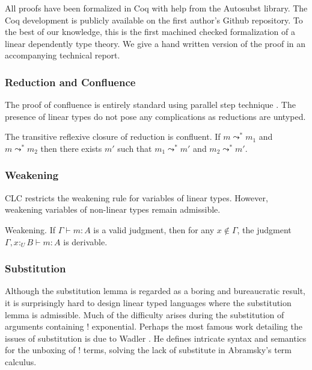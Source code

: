 \documentclass[sigplan,screen,review,anonymous]{acmart}
\newcommand{\utype}{:_{\scriptscriptstyle U}}
\newcommand{\step}{\leadsto}
\begin{document}
All proofs have been formalized in Coq with help from the Autosubst \cite{autosubst} library. The Coq development is publicly available on the first author's Github repository. To the best of our knowledge, this is the first machined checked formalization of a linear dependently type theory. We give a hand written version of the proof in an accompanying technical report.

\subsubsection{Reduction and Confluence}

The proof of confluence is entirely standard using parallel step technique \cite{takahashi}. The presence of linear types do not pose any complications as reductions are untyped.

\begin{theorem}
  The transitive reflexive closure of reduction is confluent. If $m \step^* m_1$ and $m \step^* m_2$ then there exists $m'$ such that $m_1 \step^* m'$ and $m_2 \step^* m'$.
\end{theorem}

\subsubsection{Weakening} \label{weakening}
CLC restricts the weakening rule for variables of linear types. However, weakening variables of non-linear types remain admissible.

\begin{theorem}
  Weakening. If $\Gamma \vdash m : A$ is a valid judgment, then for any $x \notin \Gamma$, the judgment $\Gamma, x \utype B \vdash m : A$ is derivable.
\end{theorem}

\subsubsection{Substitution} \label{subst}
Although the substitution lemma is regarded as a boring and bureaucratic result, it is surprisingly hard to design linear typed languages where the substitution lemma is admissible. Much of the difficulty arises during the substitution of arguments containing ! exponential. Perhaps the most famous work detailing the issues of substitution is due to Wadler \cite{substitute}. He defines intricate syntax and semantics for the unboxing of ! terms, solving the lack of substitute in Abramsky's term calculus.
\end{document}
